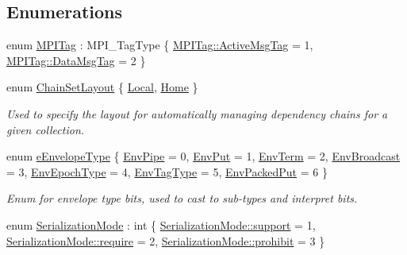 \subsection*{Enumerations}
\begin{DoxyCompactItemize}
\item 
enum \hyperlink{namespacevt_1_1messaging_a1e0d9a8b346c8536b25544c725adcf55}{M\+P\+I\+Tag} \+: M\+P\+I\+\_\+\+Tag\+Type \{ \hyperlink{namespacevt_1_1messaging_a1e0d9a8b346c8536b25544c725adcf55ab1ee9044bcae54b74056a088a0d57ac1}{M\+P\+I\+Tag\+::\+Active\+Msg\+Tag} = 1, 
\hyperlink{namespacevt_1_1messaging_a1e0d9a8b346c8536b25544c725adcf55a9bee0499791527abc5fcf1099c3cc188}{M\+P\+I\+Tag\+::\+Data\+Msg\+Tag} = 2
 \}
\item 
enum \hyperlink{namespacevt_1_1messaging_af09e66b5a14598baf7e4b56ad6080ec2}{Chain\+Set\+Layout} \{ \hyperlink{namespacevt_1_1messaging_af09e66b5a14598baf7e4b56ad6080ec2a010b35e408e991d56531802665998408}{Local}, 
\hyperlink{namespacevt_1_1messaging_af09e66b5a14598baf7e4b56ad6080ec2aa465e89bc755d534f1a8202e5f685db8}{Home}
 \}\begin{DoxyCompactList}\small\item\em Used to specify the layout for automatically managing dependency chains for a given collection. \end{DoxyCompactList}
\item 
enum \hyperlink{namespacevt_1_1messaging_a6508ef3a4701a2e6fd0bfe3edcc63a6c}{e\+Envelope\+Type} \{ \newline
\hyperlink{namespacevt_1_1messaging_a6508ef3a4701a2e6fd0bfe3edcc63a6ca3f3cc808029e09ae1e1727fcc0185853}{Env\+Pipe} = 0, 
\hyperlink{namespacevt_1_1messaging_a6508ef3a4701a2e6fd0bfe3edcc63a6ca336c26710ea637c75ac958d2d9ccab44}{Env\+Put} = 1, 
\hyperlink{namespacevt_1_1messaging_a6508ef3a4701a2e6fd0bfe3edcc63a6cab8e8cf33ab704f4caddd2d7bcc9268e8}{Env\+Term} = 2, 
\hyperlink{namespacevt_1_1messaging_a6508ef3a4701a2e6fd0bfe3edcc63a6caf1308b12de83b1b69acb484c507effb4}{Env\+Broadcast} = 3, 
\newline
\hyperlink{namespacevt_1_1messaging_a6508ef3a4701a2e6fd0bfe3edcc63a6caf3d587b9226f61f46fb0916af17120b7}{Env\+Epoch\+Type} = 4, 
\hyperlink{namespacevt_1_1messaging_a6508ef3a4701a2e6fd0bfe3edcc63a6ca26b9cbbc5e12dbc64f8906b505e7c37e}{Env\+Tag\+Type} = 5, 
\hyperlink{namespacevt_1_1messaging_a6508ef3a4701a2e6fd0bfe3edcc63a6ca2b7cfe3194094b03d3b7bccb05241824}{Env\+Packed\+Put} = 6
 \}\begin{DoxyCompactList}\small\item\em Enum for envelope type bits, used to cast to sub-\/types and interpret bits. \end{DoxyCompactList}
\item 
enum \hyperlink{namespacevt_1_1messaging_a436c5b9fc7f591e5978a136999cb9ef8}{Serialization\+Mode} \+: int \{ \hyperlink{namespacevt_1_1messaging_a436c5b9fc7f591e5978a136999cb9ef8a434990c8a25d2be94863561ae98bd682}{Serialization\+Mode\+::support} = 1, 
\hyperlink{namespacevt_1_1messaging_a436c5b9fc7f591e5978a136999cb9ef8af0ffd3b7c2574ac324603ed00488c850}{Serialization\+Mode\+::require} = 2, 
\hyperlink{namespacevt_1_1messaging_a436c5b9fc7f591e5978a136999cb9ef8abc56ee21f7c9d61984fde885e8ce116f}{Serialization\+Mode\+::prohibit} = 3
 \}
\end{DoxyCompactItemize}
